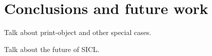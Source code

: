 \section{Conclusions and future work}

Talk about print-object and other special cases.

Talk about the future of SICL.
